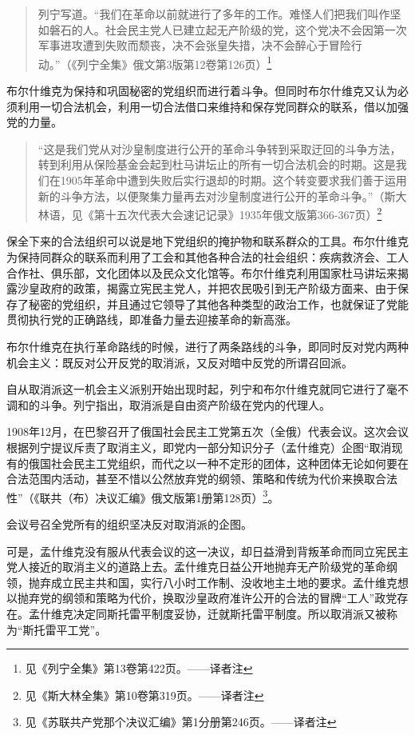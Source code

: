 \begin{quotation}
列宁写道。“我们在革命以前就进行了多年的工作。难怪人们把我们叫作坚如磐石的人。社会民主党人已建立起无产阶级的党，这个党决不会因第一次军事进攻遭到失败而颓丧，决不会张皇失措，决不会醉心于冒险行动。”（《列宁全集》俄文第3版第12卷第126页）\footnote{见《列宁全集》第13卷第422页。——译者注}
\end{quotation}

布尔什维克为保持和巩固秘密的党组织而进行着斗争。但同时布尔什维克又认为必须利用一切合法机会，利用一切合法借口来维持和保存党同群众的联系，借以加强党的力量。

\begin{quotation}
“这是我们党从对沙皇制度进行公开的革命斗争转到采取迂回的斗争方法，转到利用从保险基金会起到杜马讲坛止的所有一切合法机会的时期。这是我们在1905年革命中遭到失败后实行退却的时期。这个转变要求我们善于运用新的斗争方法，以便聚集力量再去对沙皇制度进行公开的革命斗争。”（斯大林语，见《第十五次代表大会速记记录》1935年俄文版第366-367页）\footnote{见《斯大林全集》第10卷第319页。——译者注}
\end{quotation}

保全下来的合法组织可以说是地下党组织的掩护物和联系群众的工具。布尔什维克为保持同群众的联系而利用了工会和其他各种合法的社会组织：疾病救济会、工人合作社、俱乐部，文化团体以及民众文化馆等。布尔什维克利用国家杜马讲坛来揭露沙皇政府的政策，揭露立宪民主党人，并把农民吸引到无产阶级方面来、由于保存了秘密的党组织，并且通过它领导了其他各种类型的政治工作，也就保证了党能贯彻执行党的正确路线，即准备力量去迎接革命的新高涨。

布尔什维克在执行革命路线的时候，进行了两条路线的斗争，即同时反对党内两种机会主义：既反对公开反党的取消派，又反对暗中反党的所谓召回派。

自从取消派这一机会主义派别开始出现时起，列宁和布尔什维克就同它进行了毫不调和的斗争。列宁指出，取消派是自由资产阶级在党内的代理人。

1908年12月，在巴黎召开了俄国社会民主工党第五次（全俄）代表会议。这次会议根据列宁提议斥责了取消主义，即党内一部分知识分子（孟什维克）企图“取消现有的俄国社会民主工党组织，而代之以一种不定形的团体，这种团体无论如何要在合法范围内活动，甚至不惜以公然放弃党的纲领、策略和传统为代价来换取合法性”（《联共（布）决议汇编》俄文版第1册第128页）\footnote{见《苏联共产党那个决议汇编》第1分册第246页。——译者注}。

会议号召全党所有的组织坚决反对取消派的企图。

可是，孟什维克没有服从代表会议的这一决议，却日益滑到背叛革命而同立宪民主党人接近的取消主义的道路上去。孟什维克日益公开地抛弃无产阶级党的革命纲领，抛弃成立民主共和国，实行八小时工作制、没收地主土地的要求。孟什维克想以抛弃党的纲领和策略为代价，换取沙皇政府准许公开的合法的冒牌“工人”政党存在。孟什维克决定同斯托雷平制度妥协，迁就斯托雷平制度。所以取消派又被称为“斯托雷平工党”。

